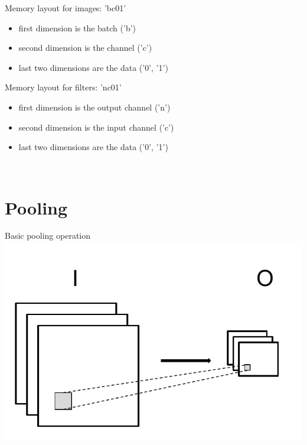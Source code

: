 \documentclass[utf8x,hyperref={pdfpagelabels=false}]{beamer}
\begin{document}
\begin{frame}
Memory layout for images: 'bc01'

\begin{itemize}
\item first dimension is the batch ('b')
\item second dimension is the channel ('c')
\item last two dimensions are the data ('0', '1')
\end{itemize}

Memory layout for filters: 'nc01'

\begin{itemize}
\item first dimension is the output channel ('n')
\item second dimension is the input channel ('c')
\item last two dimensions are the data ('0', '1')
\end{itemize}

\ \\

\end{frame}

\section{Pooling}

\begin{frame}
Basic pooling operation
\includegraphics[width=\textwidth]{Pool-max}
\end{frame}
\end{document}
